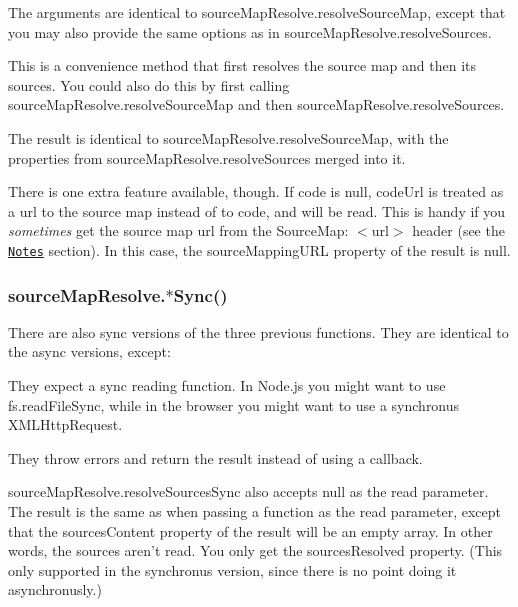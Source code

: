 The arguments are identical to {\ttfamily source\+Map\+Resolve.\+resolve\+Source\+Map}, except that you may also provide the same {\ttfamily options} as in {\ttfamily source\+Map\+Resolve.\+resolve\+Sources}.

This is a convenience method that first resolves the source map and then its sources. You could also do this by first calling {\ttfamily source\+Map\+Resolve.\+resolve\+Source\+Map} and then {\ttfamily source\+Map\+Resolve.\+resolve\+Sources}.

The result is identical to {\ttfamily source\+Map\+Resolve.\+resolve\+Source\+Map}, with the properties from {\ttfamily source\+Map\+Resolve.\+resolve\+Sources} merged into it.

There is one extra feature available, though. If {\ttfamily code} is {\ttfamily null}, {\ttfamily code\+Url} is treated as a url to the source map instead of to {\ttfamily code}, and will be read. This is handy if you {\itshape sometimes} get the source map url from the {\ttfamily Source\+Map\+: $<$url$>$} header (see the \href{#notes}{\tt Notes} section). In this case, the {\ttfamily source\+Mapping\+U\+RL} property of the result is {\ttfamily null}.

\subsubsection*{{\ttfamily source\+Map\+Resolve.$\ast$\+Sync()}}

There are also sync versions of the three previous functions. They are identical to the async versions, except\+:


\begin{DoxyItemize}
\item They expect a sync reading function. In Node.\+js you might want to use {\ttfamily fs.\+read\+File\+Sync}, while in the browser you might want to use a synchronus {\ttfamily X\+M\+L\+Http\+Request}.
\item They throw errors and return the result instead of using a callback.
\end{DoxyItemize}

{\ttfamily source\+Map\+Resolve.\+resolve\+Sources\+Sync} also accepts {\ttfamily null} as the {\ttfamily read} parameter. The result is the same as when passing a function as the {\ttfamily read parameter}, except that the {\ttfamily sources\+Content} property of the result will be an empty array. In other words, the sources aren’t read. You only get the {\ttfamily sources\+Resolved} property. (This only supported in the synchronus version, since there is no point doing it asynchronusly.)

